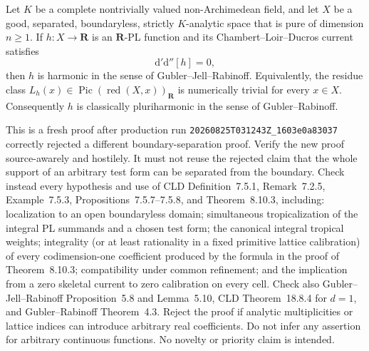 \begin{proposition}
Let $K$ be a complete nontrivially valued non-Archimedean field, and let
$X$ be a good, separated, boundaryless, strictly $K$-analytic space that is
pure of dimension $n\geq1$.  If $h:X\to\mathbf R$ is an $\mathbf R$-PL
function and its Chambert--Loir--Ducros current satisfies
\[
                         \mathrm d'\mathrm d''[h]=0,
\]
then $h$ is harmonic in the sense of Gubler--Jell--Rabinoff.  Equivalently,
the residue class $L_h(x)\in\operatorname{Pic}(\operatorname{red}(X,x))_
{\mathbf R}$ is numerically trivial for every $x\in X$.  Consequently $h$
is classically pluriharmonic in the sense of Gubler--Rabinoff.
\end{proposition}

This is a fresh proof after production run
\texttt{20260825T031243Z\_1603e0a83037} correctly rejected a different
boundary-separation proof.  Verify the new proof source-awarely and
hostilely.  It must not reuse the rejected claim that the whole support of
an arbitrary test form can be separated from the boundary.  Check instead
every hypothesis and use of CLD Definition~7.5.1, Remark~7.2.5,
Example~7.5.3, Propositions~7.5.7--7.5.8, and Theorem~8.10.3, including:
localization to an open boundaryless domain; simultaneous tropicalization
of the integral PL summands and a chosen test form; the canonical integral
tropical weights; integrality (or at least rationality in a fixed primitive
lattice calibration) of every codimension-one coefficient produced by the
formula in the proof of Theorem~8.10.3; compatibility under common
refinement; and the implication from a zero skeletal current to zero
calibration on every cell.  Check also Gubler--Jell--Rabinoff
Proposition~5.8 and Lemma~5.10, CLD Theorem~18.8.4 for $d=1$, and
Gubler--Rabinoff Theorem~4.3.  Reject the proof if analytic multiplicities
or lattice indices can introduce arbitrary real coefficients.  Do not
infer any assertion for arbitrary continuous functions.  No novelty or
priority claim is intended.
